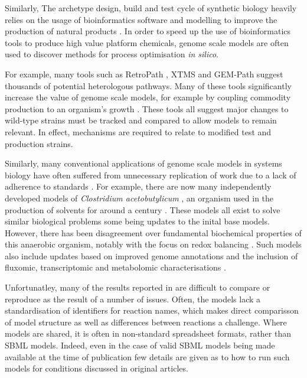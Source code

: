\documentclass[journal=asbcd6,10pt]{achemso}
\begin{document}
Similarly, The archetype design, build and test cycle of synthetic biology heavily relies on the usage of bioinformatics software and modelling to improve the production of natural products \cite{carbonell2016bioinformatics}.
In order to speed up the use of bioinformatics tools to produce high value platform chemicals, genome scale models are often used to discover methods for process optimisation \textit{in silico}.

For example, many tools such as RetroPath \cite{carbonell2013retropath}, XTMS \cite{carbonell2014xtms} and GEM-Path \cite{campodonico2014generation} suggest thousands of potential heterologous pathways.
Many of these tools significantly increase the value of genome scale models, for example by coupling commodity production to an organism's growth \cite{feist2010model}.
These tools all suggest major changes to wild-type strains must be tracked and compared to allow models to remain relevant.
In effect, mechanisms are required to relate to modified test and production strains.

Similarly, many conventional applications of genome scale models in systems biology have often suffered from unnecessary replication of work due to a lack of adherence to standards \cite{monk2014}.
For example, there are now many independently developed models of \textit{Clostridium acetobutylicum} \cite{lee2008genome, senger2008genome, mcanulty2012genome, dash2014capturing, yoo2015quantitative}, an organism used in the production of solvents for around a century \cite{moon2016one, 1919charles}.
These models all exist to solve similar biological problems some being updates to the inital base models. 
However, there has been disagreement over fundamental biochemical properties of this anaerobic organism, notably with the focus on redox balancing \cite{dash2014capturing}.
Such models also include updates based on improved genome annotations and the inclusion of fluxomic, transcriptomic and metabolomic characterisations \cite{yoo2015quantitative}.


Unfortunatley, many of the results reported in \cite{lee2008genome, senger2008genome, mcanulty2012genome, dash2014capturing, yoo2015quantitative} are difficult to compare or reproduce as the result of a number of issues.
Often, the models lack a standardisation of identifiers for reaction names, which makes direct comparisson of model structure as well as differences between reactions a challenge.
Where models are shared, it is often in non-standard spreadsheet formats, rather than SBML models.
Indeed, even in the case of valid SBML models being made available at the time of publication few details are given as to how to run such models for conditions discussed in original articles.
\end{document}
